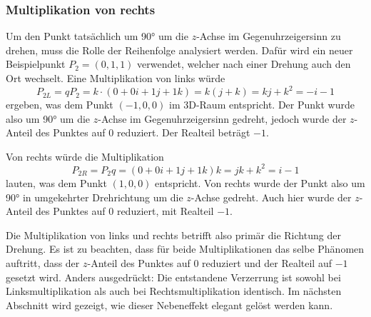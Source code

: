 \subsubsection{Multiplikation von rechts}

Um den Punkt tatsächlich um 90° um die $z$-Achse im 
Gegenuhrzeigersinn zu drehen, muss die Rolle der Reihenfolge 
analysiert werden. Dafür wird ein neuer Beispielpunkt $P_2 = (0,1,1)
$ verwendet, welcher nach einer Drehung auch den Ort wechselt. Eine 
Multiplikation von links würde
\begin{equation*}
    P_{2L} = q P_2 
    = k \cdot (0 + 0i + 1\!j + 1k) 
    = k (j + k) 
    = k\!j + k^2 
    = -i - 1
\end{equation*}
ergeben, was dem Punkt $(-1,0,0)$ im 3D-Raum entspricht. Der 
Punkt wurde also um 90° um die $z$-Achse im Gegenuhrzeigersinn 
gedreht, jedoch wurde der $z$-Anteil des Punktes auf 0 reduziert. 
Der Realteil beträgt $-1$.

Von rechts würde die Multiplikation
\begin{equation*}
    P_{2R} 
    = P_2 q 
    = (0 + 0i + 1\!j + 1k) k 
    = jk + k^2 
    = i - 1
\end{equation*}
lauten, was dem Punkt $(1,0,0)$ entspricht. Von rechts wurde 
der Punkt also um 90° in umgekehrter Drehrichtung um die $z$-Achse 
gedreht. Auch hier wurde der $z$-Anteil des Punktes auf 0 
reduziert, mit Realteil $-1$.

Die Multiplikation von links und rechts betrifft also primär die 
Richtung der Drehung. Es ist zu beachten, dass für beide 
Multiplikationen das selbe Phänomen auftritt, dass der $z$-Anteil 
des Punktes auf 0 reduziert und der Realteil auf $-1$ gesetzt wird. 
Anders ausgedrückt: Die entstandene Verzerrung ist sowohl bei 
Linksmultiplikation als auch bei Rechtsmultiplikation identisch. 
Im nächsten Abschnitt wird gezeigt, wie dieser Nebeneffekt elegant 
gelöst werden kann.

